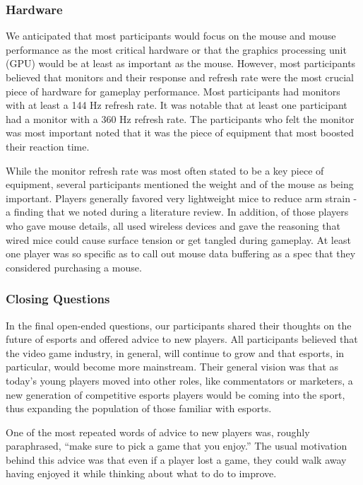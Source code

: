 \documentclass[11pt,manuscript,screen,review]{acmart} %
\begin{document}
\subsubsection{Hardware}

We anticipated that most participants would focus on the mouse and mouse performance as the most critical hardware or that the graphics processing unit (GPU) would be at least as important as the mouse. However, most participants believed that monitors and their response and refresh rate were the most crucial piece of hardware for gameplay performance. Most participants had monitors with at least a 144 Hz refresh rate. It was notable that at least one participant had a monitor with a 360 Hz refresh rate. The participants who felt the monitor was most important noted that it was the piece of equipment that most boosted their reaction time.

While the monitor refresh rate was most often stated to be a key piece of equipment, several participants mentioned the weight and of the mouse as being important. Players generally favored very lightweight mice to reduce arm strain - a finding that we noted during a literature review\cite{Li2019}. In addition, of those players who gave mouse details, all used wireless devices and gave the reasoning that wired mice could cause surface tension or get tangled during gameplay. At least one player was so specific as to call out mouse data buffering as a spec that they considered purchasing a mouse.

\subsubsection{Closing Questions}

In the final open-ended questions, our participants shared their thoughts on the future of esports and offered advice to new players. All participants believed that the video game industry, in general, will continue to grow and that esports, in particular, would become more mainstream. Their general vision was that as today’s young players moved into other roles, like commentators or marketers, a new generation of competitive esports players would be coming into the sport, thus expanding the population of those familiar with esports. 

One of the most repeated words of advice to new players was, roughly paraphrased, “make sure to pick a game that you enjoy.” The usual motivation behind this advice was that even if a player lost a game, they could walk away having enjoyed it while thinking about what to do to improve.
\end{document}
